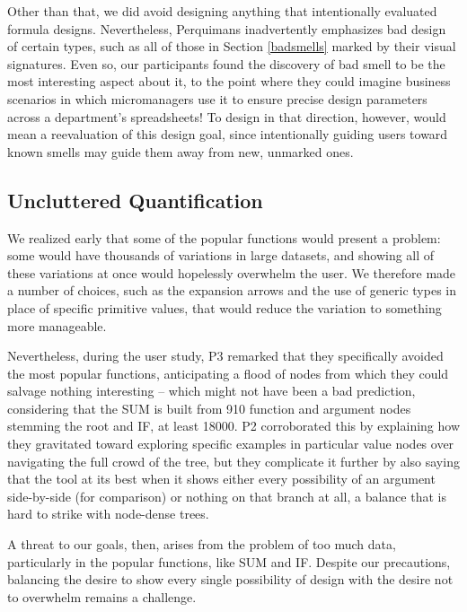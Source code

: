 \documentclass[conference]{IEEEtran}
\newcommand{\toolname}{Perquimans }
\begin{document}
	Other than that, we did avoid designing anything that intentionally evaluated
	formula designs. Nevertheless, \toolname inadvertently emphasizes bad design of
	certain types, such as all of those in Section \ref{badsmells} marked by their
	visual signatures. Even so, our participants found the discovery of bad smell
	to be the most interesting aspect about it, to the point where they could
	imagine business scenarios in which micromanagers use it to ensure precise
	design parameters across a department's spreadsheets! To design in that
	direction, however, would mean a reevaluation of this design goal, since
	intentionally guiding users toward known smells may guide them away from new,
	unmarked ones.
	
	\subsection{Uncluttered Quantification}
	
	We realized early that some of the popular functions would present a problem:
	some would have thousands of variations in large datasets, and showing all of
	these variations at once would hopelessly overwhelm the user. We therefore made
	a number of choices, such as the expansion arrows and the use of generic types
	in place of specific primitive values, that would reduce the variation to
	something more manageable.
	
	Nevertheless, during the user study, P3 remarked that they specifically avoided
	the most popular functions, anticipating a flood of nodes from which they could
	salvage nothing interesting -- which might not have been a bad prediction,
	considering that the SUM is built from 910 function and argument nodes stemming
	the root and IF, at least 18000. P2 corroborated this by explaining how they
	gravitated toward exploring specific examples in particular value nodes over
	navigating the full crowd of the tree, but they complicate it further by also
	saying that the tool at its best when it shows either every possibility of an
	argument side-by-side (for comparison) or nothing on that branch at all, a
	balance that is hard to strike with node-dense trees.
	
	A threat to our goals, then, arises from the problem of too much data,
	particularly in the popular functions, like SUM and IF. Despite our
	precautions, balancing the desire to show every single possibility of design
	with the desire not to overwhelm remains a challenge. \par
	
\end{document}
